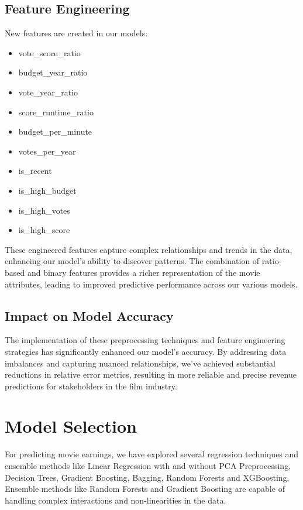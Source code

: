 \documentclass[conference]{IEEEtran}
\begin{document}
    \subsection{Feature Engineering}
        New features are created in our models:
        \begin{itemize}
            \item vote\_score\_ratio
            \item budget\_year\_ratio
            \item vote\_year\_ratio
            \item score\_runtime\_ratio
            \item budget\_per\_minute
            \item votes\_per\_year
            \item is\_recent
            \item is\_high\_budget
            \item is\_high\_votes
            \item is\_high\_score
        \end{itemize}

        These engineered features capture complex relationships and trends in the data, enhancing our model's ability to discover patterns. The combination of ratio-based and binary features provides a richer representation of the movie attributes, leading to improved predictive performance across our various models.
    \subsection{Impact on Model Accuracy}
        The implementation of these preprocessing techniques and feature engineering strategies has significantly enhanced our model's accuracy. By addressing data imbalances and capturing nuanced relationships, we've achieved substantial reductions in relative error metrics, resulting in more reliable and precise revenue predictions for stakeholders in the film industry.

\section{Model Selection}
    For predicting movie earnings, we have explored several regression techniques and ensemble methods like Linear Regression with and without PCA Preprocessing, Decision Trees, Gradient Boosting, Bagging, Random Forests and XGBoosting.
    Ensemble methods like Random Forests and Gradient Boosting are capable of handling complex interactions and non-linearities in the data.
\end{document}
